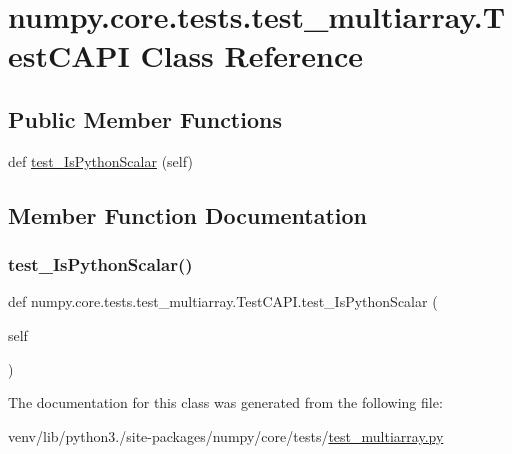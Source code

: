 \hypertarget{classnumpy_1_1core_1_1tests_1_1test__multiarray_1_1TestCAPI}{}\section{numpy.\+core.\+tests.\+test\+\_\+multiarray.\+Test\+C\+A\+PI Class Reference}
\label{classnumpy_1_1core_1_1tests_1_1test__multiarray_1_1TestCAPI}
\subsection*{Public Member Functions}
\begin{DoxyCompactItemize}
\item 
def \hyperlink{classnumpy_1_1core_1_1tests_1_1test__multiarray_1_1TestCAPI_a36ed22c45eed278ad62f25426aafc674}{test\+\_\+\+Is\+Python\+Scalar} (self)
\end{DoxyCompactItemize}


\subsection{Member Function Documentation}
\mbox{\label{classnumpy_1_1core_1_1tests_1_1test__multiarray_1_1TestCAPI_a36ed22c45eed278ad62f25426aafc674}} 
\subsubsection{\texorpdfstring{test\+\_\+\+Is\+Python\+Scalar()}{test\_IsPythonScalar()}}
{\footnotesize\ttfamily def numpy.\+core.\+tests.\+test\+\_\+multiarray.\+Test\+C\+A\+P\+I.\+test\+\_\+\+Is\+Python\+Scalar (\begin{DoxyParamCaption}\item[{}]{self }\end{DoxyParamCaption})}



The documentation for this class was generated from the following file\+:\begin{DoxyCompactItemize}
\item 
venv/lib/python3./site-\/packages/numpy/core/tests/\hyperlink{core_2tests_2test__multiarray_8py}{test\+\_\+multiarray.\+py}\end{DoxyCompactItemize}
